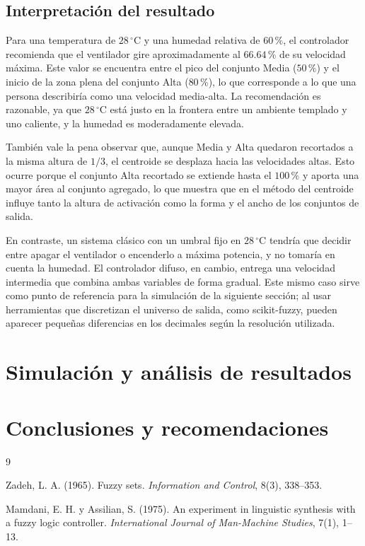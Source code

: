 \documentclass[11pt]{article}
\begin{document}
\subsection{Interpretación del resultado}

Para una temperatura de $28\,^\circ$C y una humedad relativa de $60\,\%$, el controlador recomienda que el ventilador gire aproximadamente al $66.64\,\%$ de su velocidad máxima. Este valor se encuentra entre el pico del conjunto Media ($50\,\%$) y el inicio de la zona plena del conjunto Alta ($80\,\%$), lo que corresponde a lo que una persona describiría como una velocidad media-alta. La recomendación es razonable, ya que $28\,^\circ$C está justo en la frontera entre un ambiente templado y uno caliente, y la humedad es moderadamente elevada.

También vale la pena observar que, aunque Media y Alta quedaron recortados a la misma altura de $1/3$, el centroide se desplaza hacia las velocidades altas. Esto ocurre porque el conjunto Alta recortado se extiende hasta el $100\,\%$ y aporta una mayor área al conjunto agregado, lo que muestra que en el método del centroide influye tanto la altura de activación como la forma y el ancho de los conjuntos de salida.

En contraste, un sistema clásico con un umbral fijo en $28\,^\circ$C tendría que decidir entre apagar el ventilador o encenderlo a máxima potencia, y no tomaría en cuenta la humedad. El controlador difuso, en cambio, entrega una velocidad intermedia que combina ambas variables de forma gradual. Este mismo caso sirve como punto de referencia para la simulación de la siguiente sección; al usar herramientas que discretizan el universo de salida, como scikit-fuzzy, pueden aparecer pequeñas diferencias en los decimales según la resolución utilizada.

\section{Simulación y análisis de resultados}

\section{Conclusiones y recomendaciones}

\begin{thebibliography}{9}

Zadeh, L. A. (1965). Fuzzy sets. \emph{Information and Control}, 8(3), 338--353.

Mamdani, E. H. y Assilian, S. (1975). An experiment in linguistic synthesis with a fuzzy logic controller. \emph{International Journal of Man-Machine Studies}, 7(1), 1--13.

\end{thebibliography}
\end{document}
